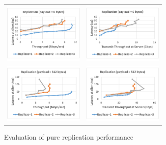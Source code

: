 \documentclass[letterpaper,twocolumn,10pt]{article}
\begin{document}
\begin{figure}
\begin{tabular}{cc}
\begin{minipage}{0.25\textwidth}
  \hspace{-0.17in}
  \includegraphics[width=\textwidth,height=3cm]{results/replication_mops_0.pdf}
\end{minipage}&
\begin{minipage}{0.25\textwidth}
  \hspace{-0.37in}
  \includegraphics[width=\textwidth,height=3cm]{results/replication_gbps_0.pdf}
\end{minipage}\\
\begin{minipage}{0.25\textwidth}
  \hspace{-0.17in}
  \includegraphics[width=\textwidth,height=3cm]{results/replication_mops_512.pdf}
\end{minipage}&
\begin{minipage}{0.25\textwidth}
  \hspace{-0.37in}
  \includegraphics[width=\textwidth,height=3cm]{results/replication_gbps_512.pdf}
\end{minipage}
\end{tabular}
\caption{Evaluation of pure replication performance}
\label{fig:pure_rep}
\end{figure}
\end{document}
